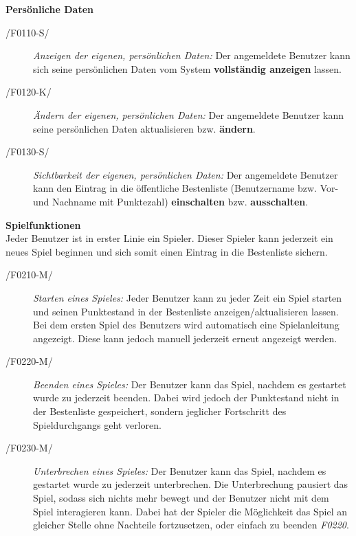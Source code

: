 \begin{loesung}
\begin{enumerate}[(a)]
                    \textbf{Persönliche Daten}
                    \begin{description}
                        \item[/F0110-S/]
                        \textit{Anzeigen der eigenen, persönlichen Daten:} Der angemeldete Benutzer kann sich seine persönlichen Daten vom System \textbf{vollständig anzeigen} lassen.
                        
                        \item[/F0120-K/]
                        \textit{Ändern der eigenen, persönlichen Daten:} Der angemeldete Benutzer kann seine persönlichen Daten aktualisieren bzw. \textbf{ändern}.
                        
                        \item[/F0130-S/]
                        \textit{Sichtbarkeit der eigenen, persönlichen Daten:} Der angemeldete Benutzer kann den Eintrag in die öffentliche Bestenliste (Benutzername bzw. Vor- und Nachname mit Punktezahl) \textbf{einschalten} bzw. \textbf{ausschalten}.       
                    \end{description}
                
                    \textbf{Spielfunktionen}\\[0.2cm]
                    Jeder Benutzer ist in erster Linie ein Spieler. Dieser Spieler kann jederzeit ein neues Spiel beginnen und sich somit einen Eintrag in die Bestenliste sichern.
                    \begin{description}
                        \item[/F0210-M/] \textit{Starten eines Spieles:} 
                        Jeder Benutzer kann zu jeder Zeit ein Spiel starten und seinen Punktestand in der Bestenliste anzeigen/aktualisieren lassen. Bei dem ersten Spiel des Benutzers wird automatisch eine Spielanleitung angezeigt. Diese kann jedoch manuell jederzeit erneut angezeigt werden.
                        
                        \item[/F0220-M/] \textit{Beenden eines Spieles:}
                         Der Benutzer kann das Spiel, nachdem es gestartet wurde zu jederzeit beenden. Dabei wird jedoch der Punktestand nicht in der Bestenliste gespeichert, sondern jeglicher Fortschritt des Spieldurchgangs geht verloren.
                        
                        \item[/F0230-M/] \textit{Unterbrechen eines Spieles:} 
                        Der Benutzer kann das Spiel, nachdem es gestartet wurde zu jederzeit unterbrechen. Die Unterbrechung pausiert das Spiel, sodass sich nichts mehr bewegt und der Benutzer nicht mit dem Spiel interagieren kann. Dabei hat der Spieler die Möglichkeit das Spiel an gleicher Stelle ohne Nachteile fortzusetzen, oder einfach zu beenden \textit{F0220}.
                        

\end{description}
\end{enumerate}
\end{loesung}
